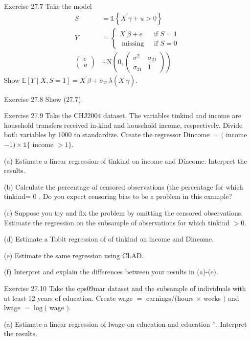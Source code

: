 \documentclass[10pt]{article}
\begin{document}
Exercise 27.7 Take the model
$$
\begin{aligned}
S &=\mathbb{1}\left\{X^{\prime} \gamma+u>0\right\} \\
Y &=\left\{\begin{array}{cc}
X^{\prime} \beta+e & \text { if } S=1 \\
\text { missing } & \text { if } S=0
\end{array}\right.\\
\left(\begin{array}{c}
e \\
u
\end{array}\right) & \sim \mathrm{N}\left(0,\left(\begin{array}{cc}
\sigma^{2} & \sigma_{21} \\
\sigma_{21} & 1
\end{array}\right)\right)
\end{aligned}
$$
Show $\mathbb{E}[Y \mid X, S=1]=X^{\prime} \beta+\sigma_{21} \lambda\left(X^{\prime} \gamma\right)$.

Exercise 27.8 Show (27.7).

Exercise 27.9 Take the $\mathrm{CH} \mathrm{J} 2004$ dataset. The variables tinkind and income are household transfers received in-kind and household income, respectively. Divide both variables by 1000 to standardize. Create the regressor Dincome $=($ income $-1) \times \mathbb{1}\{$ income $>1\}$.

(a) Estimate a linear regression of tinkind on income and Dincome. Interpret the results.

(b) Calculate the percentage of censored observations (the percentage for which tinkind= 0 . Do you expect censoring bias to be a problem in this example?

(c) Suppose you try and fix the problem by omitting the censored observations. Estimate the regression on the subsample of observations for which tinkind $>0$.

(d) Estimate a Tobit regression of of tinkind on income and Dincome.

(e) Estimate the same regression using CLAD.

(f) Interpret and explain the differences between your results in (a)-(e).

Exercise 27.10 Take the cps09mar dataset and the subsample of individuals with at least 12 years of education. Create wage $=$ earnings/(hours $\times$ weeks $)$ and lwage $=\log ($ wage $)$.

(a) Estimate a linear regression of lwage on education and education ${ }^{\wedge}$. Interpret the results.
\end{document}

